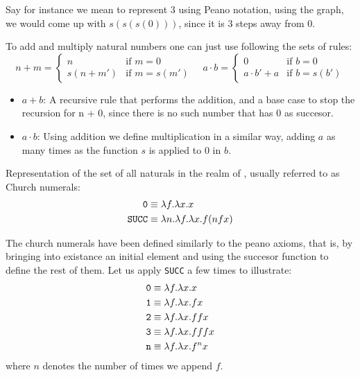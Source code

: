 \documentclass[12pt]{book}
\begin{document}
\begin{example}
  Say for instance we mean to represent $ 3 $ using Peano notation, using the graph, we would come up with $ s(s(s(0))) $, since it is $3$ steps away from $0$.
\end{example}
\begin{definition} To add and multiply natural numbers one can just use following the sets of rules:
  \[
    n + m = 
    \begin{cases}
      n & \text{if } m = 0 \\
      s(n + m') & \text{if } m = s(m')
    \end{cases}
    \quad
    a \cdot b =
    \begin{cases}
      0 & \text{if } b = 0 \\
      a \cdot b' + a & \text{if } b = s(b')
    \end{cases}
  \]
\end{definition}
\begin{itemize}
\item \underline{$a + b$}: A recursive rule that performs the addition, and a base case to stop the recursion for n + 0, since there is no such number that has $ 0 $ as succesor.
\item \underline{$a \cdot b$}: Using addition we define multiplication in a similar way, adding $a$ as many times as the function $s$ is applied to $0$ in $b$.
\end{itemize}
\begin{definition} Representation of the set of all naturals in the realm of \lcalc, usually referred to as Church numerals:
  \label{def:church-naturals}
  \begin{align*}
    \texttt{0} &\equiv \lambda f.\lambda x. x \\
    \texttt{SUCC} &\equiv \lambda n. \lambda f. \lambda x . f ( n f x )
  \end{align*}
\end{definition}
\begin{example}
  The church numerals have been defined similarly to the peano axioms, that is, by bringing into existance an initial element and using the succesor function to define the rest of them. Let us apply \texttt{SUCC} a few times to illustrate:
  \begin{align*}
    \texttt{0} &\equiv \lambda f.\lambda x. x \\
    \texttt{1} &\equiv \lambda f.\lambda x. f x \\
    \texttt{2} &\equiv \lambda f.\lambda x. f f x \\
    \texttt{3} &\equiv \lambda f.\lambda x. f f f x \\
    \texttt{n} &\equiv \lambda f.\lambda x. f ^ n x
  \end{align*}
  where $ n $ denotes the number of times we append $ f $.
\end{example}
\end{document}
